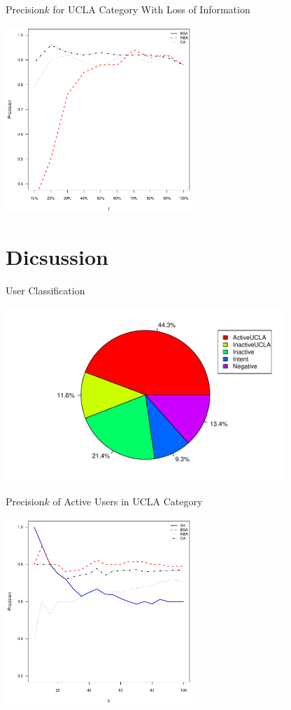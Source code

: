 \documentclass{beamer}
\begin{document}
\begin{frame}{Precision\at$k$ for UCLA Category With Loss of Information}
\begin{center}
  \includegraphics[width=200pt]{experiment/e2_ucla.pdf}
\end{center}
\end{frame}


\section{Dicsussion}
\begin{frame}{User Classification}
\begin{center}
  \includegraphics[width=300pt]{experiment/uc.pdf}
\end{center}
\end{frame}

\begin{frame}{Precision\at$k$ of Active Users in UCLA Category}
\begin{center}
  \includegraphics[width=200pt]{experiment/ap.pdf}
\end{center}
\end{frame}
\end{document}
